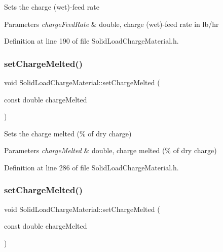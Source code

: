 Sets the charge (wet)-\/feed rate 
\begin{DoxyParams}{Parameters}
{\em charge\+Feed\+Rate} & double, charge (wet)-\/feed rate in lb/hr \\
\hline
\end{DoxyParams}


Definition at line 190 of file Solid\+Load\+Charge\+Material.\+h.

\mbox{\label{class_solid_load_charge_material_a9999a2976e8a8662a86cc2a159df5202}} 
\subsubsection{\texorpdfstring{set\+Charge\+Melted()}{setChargeMelted()}\hspace{0.1cm}{\footnotesize\ttfamily [1/3]}}
{\footnotesize\ttfamily void Solid\+Load\+Charge\+Material\+::set\+Charge\+Melted (\begin{DoxyParamCaption}\item[{const double}]{charge\+Melted }\end{DoxyParamCaption})\hspace{0.3cm}{\ttfamily [inline]}}

Sets the charge melted (\% of dry charge) 
\begin{DoxyParams}{Parameters}
{\em charge\+Melted} & double, charge melted (\% of dry charge) \\
\hline
\end{DoxyParams}


Definition at line 286 of file Solid\+Load\+Charge\+Material.\+h.

\mbox{\label{class_solid_load_charge_material_a9999a2976e8a8662a86cc2a159df5202}} 
\subsubsection{\texorpdfstring{set\+Charge\+Melted()}{setChargeMelted()}\hspace{0.1cm}{\footnotesize\ttfamily [2/3]}}
{\footnotesize\ttfamily void Solid\+Load\+Charge\+Material\+::set\+Charge\+Melted (\begin{DoxyParamCaption}\item[{const double}]{charge\+Melted }\end{DoxyParamCaption})\hspace{0.3cm}{\ttfamily [inline]}}

